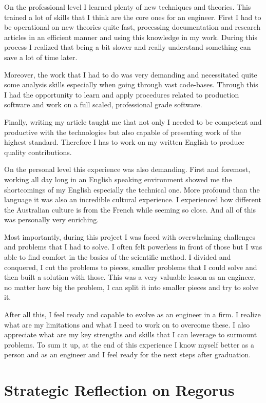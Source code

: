 \documentclass[10pt]{report}
\begin{document}
On the professional level I learned plenty of new techniques and theories. This trained a lot of skills that I think are the core ones for an engineer. First I had to be operational on new theories quite fast, processing documentation and research articles in an efficient manner and using this knowledge in my work. During this process I realized that being a bit slower and really understand something can save a lot of time later.

Moreover, the work that I had to do was very demanding and necessitated quite some analysis skills especially when going through vast code-bases. Through this I had the opportunity to learn and apply procedures related to production software and work on a full scaled, professional grade software.

Finally, writing my article taught me that not only I needed to be competent and productive with the technologies but also capable of presenting work of the highest standard. Therefore I has to work on my written English to produce quality contributions.

On the personal level this experience was also demanding. First and foremost, working all day long in an English speaking environment showed me the shortcomings of my English especially the technical one. More profound than the language it was also an incredible cultural experience. I experienced how different the Australian culture is from the French while seeming so close. And all of this was personally very enriching.

Most importantly, during this project I was faced with overwhelming challenges and problems that I had to solve. I often felt powerless in front of those but I was able to find comfort in the basics of the scientific method. I divided and conquered, I cut the problems to pieces, smaller problems that I could solve and then built a solution with those. This was a very valuable lesson as an engineer, no matter how big the problem, I can split it into smaller pieces and try to solve it.

After all this, I feel ready and capable to evolve as an engineer in a firm. I realize what are my limitations and what I need to work on to overcome these. I also appreciate what are my key strengths and skills that I can leverage to surmount problems. To sum it up, at the end of this experience I know myself better as a person and as an engineer and I feel ready for the next steps after graduation.


\newpage
{}
\chapter{ Strategic Reflection on Regorus}
\end{document}
